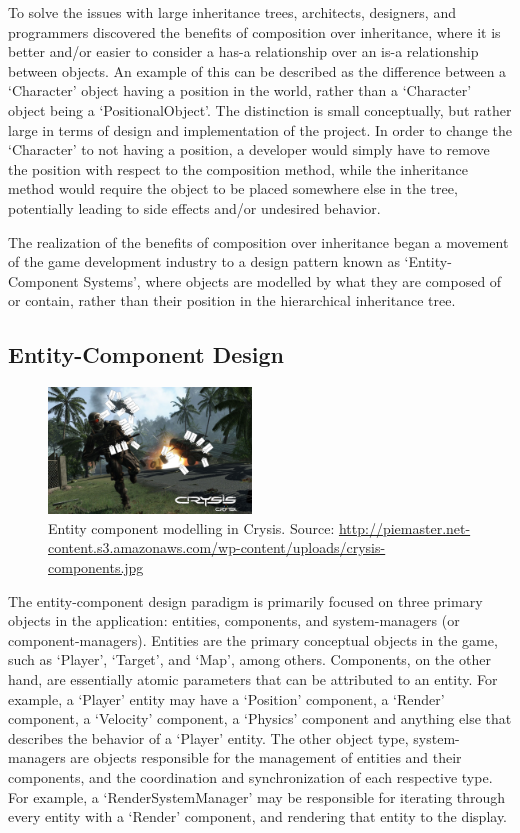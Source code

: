 To solve the issues with large inheritance trees, architects, designers, and programmers discovered\cite{haller2002generic} the benefits of composition over inheritance, where it is better and/or easier to consider a has-a relationship over an is-a relationship between objects. An example of this can be described as the difference between a `Character' object having a position in the world, rather than a `Character' object being a `PositionalObject'. The distinction is small conceptually, but rather large in terms of design and implementation of the project. In order to change the `Character' to not having a position, a developer would simply have to remove the position with respect to the composition method, while the inheritance method would require the object to be placed somewhere else in the tree, potentially leading to side effects and/or undesired behavior.

The realization of the benefits of composition over inheritance began a movement of the game development industry to a design pattern known as `Entity-Component Systems', where objects are modelled by what they are composed of or contain, rather than their position in the hierarchical inheritance tree.

\subsection{Entity-Component Design}

\begin{figure}[!ht]
  \centering \includegraphics[width=0.48\textwidth]{Images/crysis-components.jpg}
	\caption{Entity component modelling in Crysis. Source: \url{http://piemaster.net-content.s3.amazonaws.com/wp-content/uploads/crysis-components.jpg}}
\end{figure}

The entity-component design paradigm is primarily focused on three primary objects in the application: entities, components, and system-managers (or component-managers). Entities are the primary conceptual objects in the game, such as `Player', `Target', and `Map', among others. Components, on the other hand, are essentially atomic parameters that can be attributed to an entity. For example, a `Player' entity may have a `Position' component, a `Render' component, a `Velocity' component, a `Physics' component and anything else that describes the behavior of a `Player' entity. The other object type, system-managers are objects responsible for the management of entities and their components, and the coordination and synchronization of each respective type. For example, a `RenderSystemManager' may be responsible for iterating through every entity with a `Render' component, and rendering that entity to the display.

